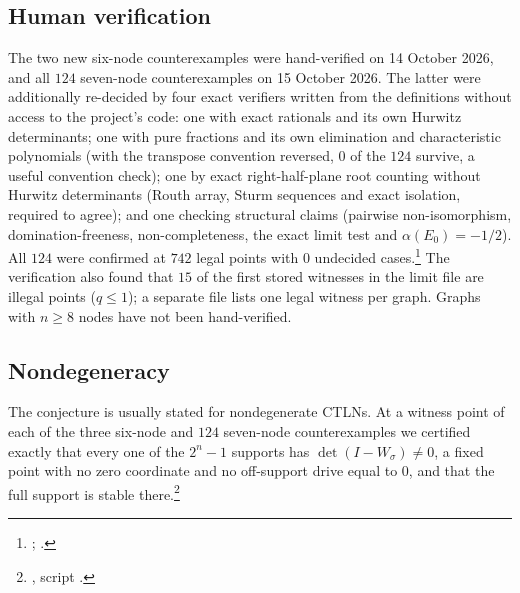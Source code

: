 \documentclass[11pt]{article}
\theoremstyle{definition}
\begin{document}
\subsection{Human verification}
The two new six-node counterexamples were hand-verified on 14 October 2026, and all $124$ seven-node counterexamples on
15 October 2026. The latter were additionally re-decided by four exact verifiers written from the definitions without access
to the project's code: one with exact rationals and its own Hurwitz determinants; one with pure fractions and its own
elimination and characteristic polynomials (with the transpose convention reversed, $0$ of the $124$ survive, a useful
convention check); one by exact right-half-plane root counting without Hurwitz determinants (Routh array, Sturm sequences and
exact isolation, required to agree); and one checking structural claims (pairwise non-isomorphism, domination-freeness,
non-completeness, the exact limit test and $\alpha(E_0)=-1/2$). All $124$ were confirmed at $742$ legal points with $0$ undecided
cases.\footnote{; .} The verification also
found that $15$ of the first stored witnesses in the limit file are illegal points ($q\le1$); a separate file lists one legal
witness per graph. Graphs with $n\ge8$ nodes have not been hand-verified.

\subsection{Nondegeneracy}
The conjecture is usually stated for nondegenerate CTLNs. At a witness point of each of the three six-node and $124$ seven-node
counterexamples we certified exactly that every one of the $2^n-1$ supports has $\det(I-W_\sigma)\ne0$, a fixed point with no zero
coordinate and no off-support drive equal to $0$, and that the full support is stable there.\footnote{, script .}
\end{document}
